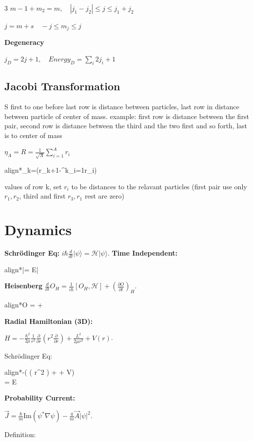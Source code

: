 \documentclass[10pt,a4paper]{article}
\newcommand{\important}[1]{\begin{empheq}[box=\fbox]{align*}#1\end{empheq}}
\begin{document}
\begin{multicols*}{3}
$m-1 + m_2 = m, \quad |j_1 - j_2| \le j \le j_1 + j_2$

$j=m+s \quad -j \le m_j \leq j$

\textbf{Degeneracy}

$j_D=2j+1, \quad Energy_D=\sum_i2j_i+1$

\subsection*{Jacobi Transformation}
S first to one before last row is distance between particles, last row in distance between particle of center of mass.
example: first row is distance between the first pair, second row is distance between the third and the two first and so forth, last is to center of mass

$\eta_A=R=\frac{1}{\sqrt{A}}\sum_{i=1}^A r_i$

\important{\eta_k=(r_{k+1}-\sum^k_{i=1}r_i)}

values of row k, set $r_i$ to be distances to the relavant particles (first pair use only $r_1,r_2$, third and first $r_3,r_1$ rest are zero)

\section*{Dynamics}
\textbf{Schrödinger Eq:} $i\hbar \frac{d}{dt}|\psi\rangle = \mathcal{H}|\psi\rangle$.
\textbf{Time Independent:} 
\important{|\psi\rangle = E|\psi\rangle}
\textbf{Heisenberg} $\frac{d}{dt} O_H =  [O_H, \mathcal{H}] + ()_H$.
\important{\langle O \rangle = \frac{1}{i\hbar}\langle [O, \mathcal{H}] \rangle + \langle \frac{\partial O}{\partial t} \rangle}

\textbf{Radial Hamiltonian (3D):}

$H = -\frac{\hbar^2}{2\mu} \frac{1}{r^2} \frac{\partial}{\partial r} \left( r^2  \right) +  + V(r)$.

Schrödinger Eq:
\important{-\left(  \frac{\partial}{\partial r} \left( r^2 \frac{\partial}{\partial r} \right) + \frac{L^2}{2\mu r^2} + V\right) \Psi \\ = E\Psi}

\textbf{Probability Current:} 

$\vec{J} = \frac{\hbar}{m}\text{Im}(\psi^*\nabla\psi) - \frac{q}{m}\vec{A}|\psi|^2$.

Definition: 


\end{multicols*}
\end{document}
